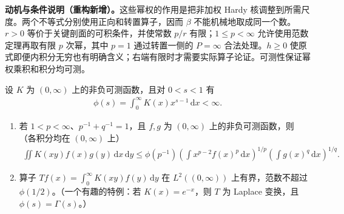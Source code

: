 \documentclass[../../main.tex]{subfiles}
\begin{document}
\begin{remark}
\textbf{动机与条件说明（重构新增）。}这些幂权的作用是把非加权 Hardy 核调整到所需尺度。两个不等式分别使用正向和转置算子，因而 $\beta$ 不能机械地取成同一个数。$r>0$ 等价于关键剖面的可积条件，并使常数 $p/r$ 有限；$1\leqslant p<\infty$ 允许使用范数定理再取有限 $p$ 次幂，其中 $p=1$ 通过转置一侧的 $P=\infty$ 合法处理。$h\geqslant0$ 使原式即便内积分无穷也有明确含义；右端有限时才需要实际算子论证。可测性保证幂权乘积和积分均可测。
\end{remark}
\begin{exercise}\label{exercise:ch06-mellin-laplace-bound}
设 $K$ 为 $(0,\infty)$ 上的非负可测函数，且对 $0<s<1$ 有
\begin{align*}
\phi(s)=\int_0^\infty K(x)x^{s-1}\,\mathrm dx<\infty.
\end{align*}
\begin{enumerate}
\item\label{item:ch06-mellin-bilinear} 若 $1<p<\infty$、$p^{-1}+q^{-1}=1$，且 $f,g$ 为 $(0,\infty)$ 上的非负可测函数，则（各积分均在 $(0,\infty)$ 上）
\begin{align*}
\iint K(xy)f(x)g(y)\,\mathrm dx\,\mathrm dy
\leqslant\phi(p^{-1})\left(\int x^{p-2}f(x)^p\,\mathrm dx\right)^{1/p}
\left(\int g(x)^q\,\mathrm dx\right)^{1/q}.
\end{align*}
\item\label{item:ch06-laplace-ltwo} 算子 $Tf(x)=\int_0^\infty K(xy)f(y)\,\mathrm dy$ 在 $L^2((0,\infty))$ 上有界，范数不超过 $\phi(1/2)$。（一个有趣的特例：若 $K(x)=e^{-x}$，则 $T$ 为 Laplace 变换，且 $\phi(s)=\Gamma(s)$。）
\end{enumerate}
\end{exercise}
\end{document}
